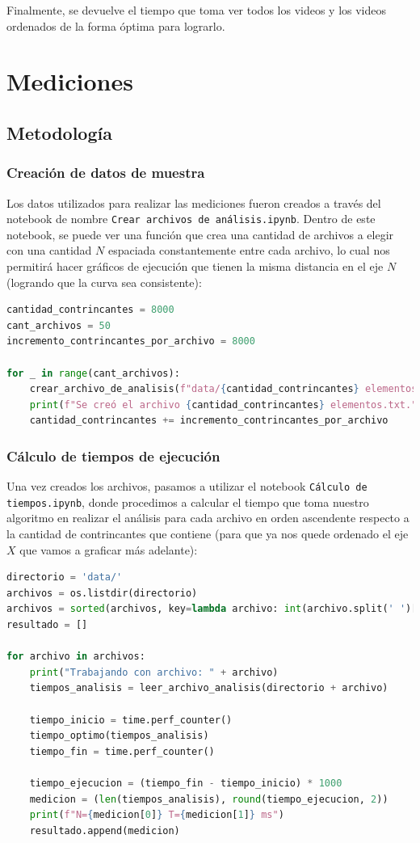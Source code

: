 \documentclass{estilo}
\begin{document}
Finalmente, se devuelve el tiempo que toma ver todos los videos y los videos ordenados de la forma óptima para lograrlo.
\newpage

\section{Mediciones}
\subsection{Metodología}
\subsubsection{Creación de datos de muestra}
Los datos utilizados para realizar las mediciones fueron creados a través del notebook de nombre \texttt{Crear archivos de análisis.ipynb}. Dentro de este notebook, se puede ver una función que crea una cantidad de archivos a elegir con una cantidad $N$ espaciada constantemente entre cada archivo, lo cual nos permitirá hacer gráficos de ejecución que tienen la misma distancia en el eje $N$ (logrando que la curva sea consistente):

\begin{lstlisting}[language=Python]
cantidad_contrincantes = 8000
cant_archivos = 50
incremento_contrincantes_por_archivo = 8000

for _ in range(cant_archivos):
    crear_archivo_de_analisis(f"data/{cantidad_contrincantes} elementos.txt", cantidad_contrincantes)
    print(f"Se creó el archivo {cantidad_contrincantes} elementos.txt.")
    cantidad_contrincantes += incremento_contrincantes_por_archivo
\end{lstlisting}

\subsubsection{Cálculo de tiempos de ejecución}

Una vez creados los archivos, pasamos a utilizar el notebook \texttt{Cálculo de tiempos.ipynb}, donde procedimos a calcular el tiempo que toma nuestro algoritmo en realizar el análisis para cada archivo en orden ascendente respecto a la cantidad de contrincantes que contiene (para que ya nos quede ordenado el eje $X$ que vamos a graficar más adelante):

\begin{lstlisting}[language=Python]
directorio = 'data/'  
archivos = os.listdir(directorio)
archivos = sorted(archivos, key=lambda archivo: int(archivo.split(' ')[0]))
resultado = []

for archivo in archivos:
    print("Trabajando con archivo: " + archivo)
    tiempos_analisis = leer_archivo_analisis(directorio + archivo)
    
    tiempo_inicio = time.perf_counter()
    tiempo_optimo(tiempos_analisis)
    tiempo_fin = time.perf_counter()

    tiempo_ejecucion = (tiempo_fin - tiempo_inicio) * 1000
    medicion = (len(tiempos_analisis), round(tiempo_ejecucion, 2))
    print(f"N={medicion[0]} T={medicion[1]} ms")
    resultado.append(medicion)
\end{lstlisting}
\end{document}
